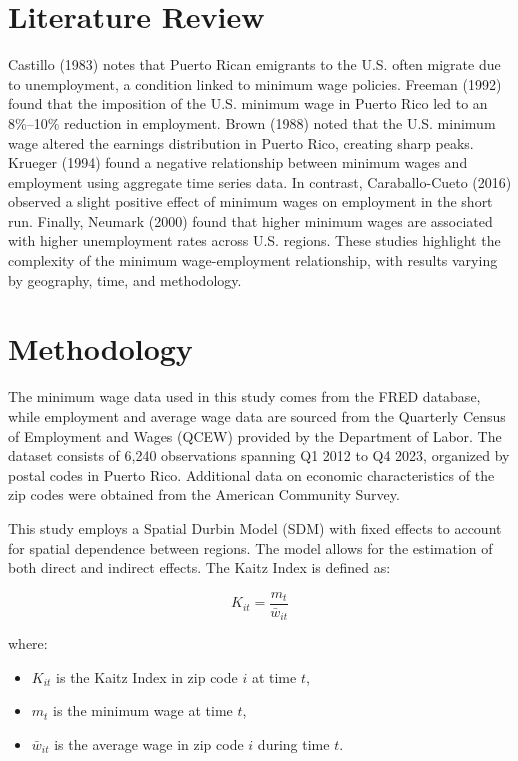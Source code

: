 \documentclass[12pt]{article}
\begin{document}
\section{Literature Review}

Castillo (1983) \cite{castillo1983jobless} notes that Puerto Rican emigrants to the U.S. often migrate due to unemployment, a condition linked to minimum
wage policies. Freeman (1992) \cite{castillo1992minimum} found that the imposition of the U.S. minimum wage in Puerto Rico led to an 8\%–10\% reduction
in employment. Brown (1988) \cite{brown1988minimum} noted that the U.S. minimum wage altered the earnings distribution in Puerto Rico, creating sharp
peaks. Krueger (1994) \cite{card1994comment} found a negative relationship between minimum wages and employment using aggregate time series data.
In contrast, Caraballo-Cueto (2016) \cite{caraballo2016there} observed a slight positive effect of minimum wages on employment in the short run.
Finally, Neumark (2000) \cite{neumark2000minimum} found that higher minimum wages are associated with higher unemployment rates across U.S. regions.
These studies highlight the complexity of the minimum wage-employment relationship, with results varying by geography, time,
and methodology.

\section{Methodology}

The minimum wage data used in this study comes from the FRED database, while employment and average wage data are sourced from the Quarterly
Census of Employment and Wages (QCEW) provided by the Department of Labor. The dataset consists of 6,240 observations spanning Q1 2012 to Q4 2023,
organized by postal codes in Puerto Rico. Additional data on economic characteristics of the zip codes were obtained from the American Community Survey.

This study employs a Spatial Durbin Model (SDM) \cite{lee2016identification} with fixed effects to account for spatial dependence between regions.
The model allows for the estimation of both direct and indirect effects. The Kaitz Index is defined as:

\[
	K_{it} = \frac{m_t}{\bar{w}_{it}}
\]

where:
\begin{itemize}
	\item $K_{it}$ is the Kaitz Index in zip code $i$ at time $t$,
	\item $m_t$ is the minimum wage at time $t$,
	\item $\bar{w}_{it}$ is the average wage in zip code $i$ during time $t$.
\end{itemize}
\end{document}
